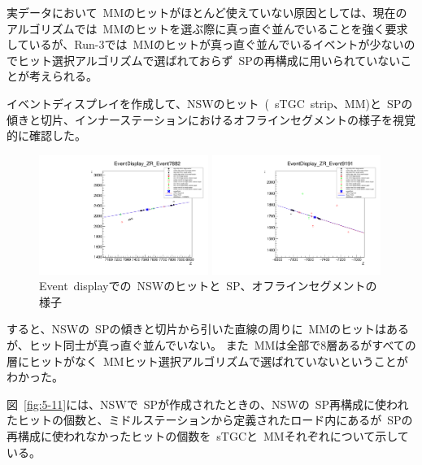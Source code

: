 実データにおいて~MMのヒットがほとんど使えていない原因としては、現在のアルゴリズムでは~MMのヒットを選ぶ際に真っ直ぐ並んでいることを強く要求しているが、Run-3では~MMのヒットが真っ直ぐ並んでいるイベントが少ないのでヒット選択アルゴリズムで選ばれておらず~SPの再構成に用いられていないことが考えられる。

イベントディスプレイを作成して、NSWのヒット~(~sTGC~strip、MM)と~SPの傾きと切片、インナーステーションにおけるオフラインセグメントの様子を視覚的に確認した。

\begin{figure}[H]
  \begin{minipage}[b]{0.45\linewidth}
      \centering
      \includegraphics[clip, width=5.5cm]{fig/5/EventDisplay_7882_ZR_withMM.pdf}
  \end{minipage}
    \begin{minipage}[b]{0.45\linewidth}
      \centering
      \includegraphics[clip, width=5.5cm]{fig/5/EventDisplay_9191_ZR_withMM.pdf}
  \end{minipage}
  \caption{Event~displayでの~NSWのヒットと~SP、オフラインセグメントの様子}\label{fig:5-10}
\end{figure}

すると、NSWの~SPの傾きと切片から引いた直線の周りに~MMのヒットはあるが、ヒット同士が真っ直ぐ並んでいない。
また~MMは全部で8層あるがすべての層にヒットがなく~MMヒット選択アルゴリズムで選ばれていないということがわかった。


図~\ref{fig:5-11}には、NSWで~SPが作成されたときの、NSWの~SP再構成に使われたヒットの個数と、ミドルステーションから定義されたロード内にあるが~SPの再構成に使われなかったヒットの個数を~sTGCと~MMそれぞれについて示している。

